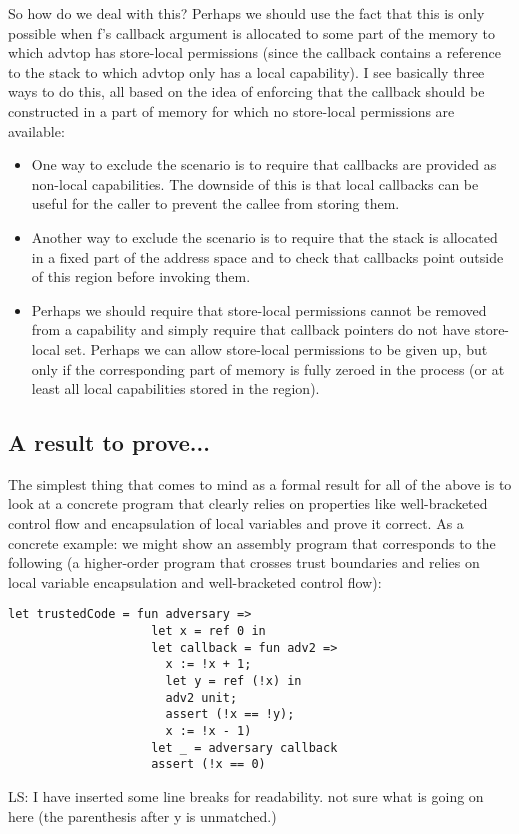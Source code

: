 \documentclass[a4paper]{article}
\newcommand\lau[1]{{\color{purple} \sf \footnotesize {LS: #1}}\\}
\begin{document}
\begin{lemma}
So how do we deal with this? Perhaps we should use the fact that this is only
possible when f's callback argument is allocated to some part of the memory to
which advtop has store-local permissions (since the callback contains a
reference to the stack to which advtop only has a local capability). I see
basically three ways to do this, all based on the idea of enforcing that the
callback should be constructed in a part of memory for which no store-local
permissions are available:
\begin{itemize}
\item One way to exclude the scenario is to require that callbacks are provided
  as non-local capabilities. The downside of this is that local callbacks can be
  useful for the caller to prevent the callee from storing them.
\item Another way to exclude the scenario is to require that the stack is
  allocated in a fixed part of the address space and to check that callbacks
  point outside of this region before invoking them.
\item Perhaps we should require that store-local permissions cannot be removed
  from a capability and simply require that callback pointers do not have
  store-local set. Perhaps we can allow store-local permissions to be given up,
  but only if the corresponding part of memory is fully zeroed in the process
  (or at least all local capabilities stored in the region).
\end{itemize}

\subsection{A result to prove...}
\label{sec:os-less-stack-property}

The simplest thing that comes to mind as a formal result for all of the above is
to look at a concrete program that clearly relies on properties like
well-bracketed control flow and encapsulation of local variables and prove it
correct. As a concrete example: we might show an assembly program that
corresponds to the following (a higher-order program that crosses trust
boundaries and relies on local variable encapsulation and well-bracketed control
flow):
\begin{verbatim}
let trustedCode = fun adversary =>
                    let x = ref 0 in
                    let callback = fun adv2 => 
                      x := !x + 1; 
                      let y = ref (!x) in 
                      adv2 unit; 
                      assert (!x == !y); 
                      x := !x - 1)
                    let _ = adversary callback
                    assert (!x == 0)
\end{verbatim}
\lau{I have inserted some line breaks for readability. not sure what is going on here (the parenthesis after y is unmatched.)}

\end{lemma}
\end{document}
